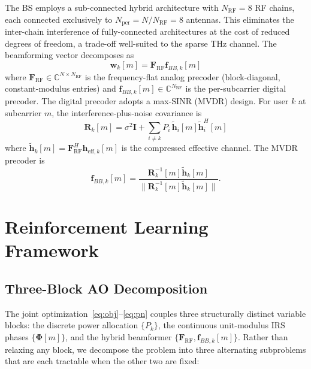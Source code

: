 \documentclass[journal,twocolumn]{IEEEtran}
\newcommand{\vect}[1]{\mathbf{#1}}
\newcommand{\mat}[1]{\mathbf{#1}}
\newcommand{\C}{\mathbb{C}}
\begin{document}
The BS employs a sub-connected hybrid architecture with $N_{\text{RF}} = 8$ RF chains, each connected exclusively to $N_{\text{per}} = N/N_{\text{RF}} = 8$ antennas. This eliminates the inter-chain interference of fully-connected architectures at the cost of reduced degrees of freedom, a trade-off well-suited to the sparse THz channel. The beamforming vector decomposes as
\begin{equation}
\vect{w}_k[m] = \mat{F}_{\text{RF}} \vect{f}_{BB,k}[m]
\label{eq:hybrid_bf}
\end{equation}
where $\mat{F}_{\text{RF}} \in \C^{N \times N_{\text{RF}}}$ is the frequency-flat analog precoder (block-diagonal, constant-modulus entries) and $\vect{f}_{BB,k}[m] \in \C^{N_{\text{RF}}}$ is the per-subcarrier digital precoder. The digital precoder adopts a max-SINR (MVDR) design. For user $k$ at subcarrier $m$, the interference-plus-noise covariance is
\begin{equation}
\mat{R}_k[m] = \sigma^2\mat{I} + \sum_{i \neq k}P_i\,\tilde{\vect{h}}_i[m]\tilde{\vect{h}}_i^H[m]
\label{eq:Rk}
\end{equation}
where $\tilde{\vect{h}}_k[m] = \mat{F}_{\text{RF}}^H\vect{h}_{\text{eff},k}[m]$ is the compressed effective channel. The MVDR precoder is
\begin{equation}
\vect{f}_{BB,k}[m] = \frac{\mat{R}_k^{-1}[m]\tilde{\vect{h}}_k[m]}{\|\mat{R}_k^{-1}[m]\tilde{\vect{h}}_k[m]\|}.
\label{eq:mvdr}
\end{equation}

\section{Reinforcement Learning Framework}
\label{sec:rl}

\subsection{Three-Block AO Decomposition}

The joint optimization~\eqref{eq:obj}--\eqref{eq:pn} couples three structurally distinct variable blocks: the discrete power allocation $\{P_k\}$, the continuous unit-modulus IRS phases $\{\bm{\Phi}[m]\}$, and the hybrid beamformer $\{\mat{F}_{\text{RF}}, \vect{f}_{BB,k}[m]\}$. Rather than relaxing any block, we decompose the problem into three alternating subproblems that are each tractable when the other two are fixed:
\end{document}
